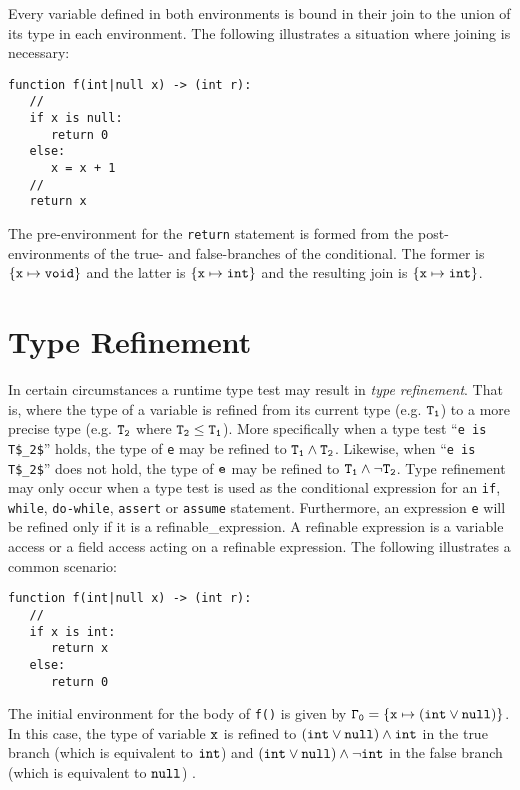 Every variable defined in both environments is bound in their join to
the union of its type in each environment.  The following illustrates
a situation where joining is necessary:

\begin{lstlisting}
function f(int|null x) -> (int r):
   //
   if x is null:
      return 0
   else:
      x = x + 1
   //
   return x
\end{lstlisting}

The pre-environment for the \lstinline{return} statement is formed
from the post-environments of the true- and false-branches of the
conditional.  The former is ${\tt\{x\mapsto void\}}$ and the latter is
${\tt\{x\mapsto int\}}$ and the resulting join is
${\tt\{x\mapsto int\}}$.

\section{Type Refinement}

In certain circumstances a runtime type test may result in {\em type
  refinement}.  That is, where the type of a variable is refined from
its current type (e.g. ${\tt T_1}$) to a more precise type (e.g.
${\tt T_2}$ where ${\tt T_2\le T_1}$).  More specifically when a type
test ``\lstinline{e is T$_2$}'' holds, the type of \lstinline{e} may
be refined to ${\tt T_1\land T_2}$.  Likewise, when ``\lstinline{e is T$_2$}'' 
does not hold, the type of ${\tt e}$ may be refined to
${\tt T_1\land\neg T_2}$.  Type refinement may only occur when a type
test is used as the conditional expression for an \lstinline{if},
\lstinline{while}, \lstinline{do-while}, \lstinline{assert} or
\lstinline{assume} statement.  Furthermore, an expression
\lstinline{e} will be refined only if it is a
\gls{refinable_expression}.  A refinable expression is a variable access or
a field access acting on a refinable expression.  The following
illustrates a common scenario:

\begin{lstlisting}
function f(int|null x) -> (int r):
   //
   if x is int:
      return x
   else:
      return 0
\end{lstlisting}

The initial environment for the body of \lstinline{f()} is given by
${\tt\Gamma_0=\{x\mapsto(int\lor null)\}}$.  In this case, the type of
variable ${\tt x}$ is refined to ${\tt (int\lor null)\land int}$ in
the true branch (which is equivalent to ${\tt int}$) and
${\tt (int\lor null)\land\neg int}$ in the false branch (which is
equivalent to ${\tt null}$) .


